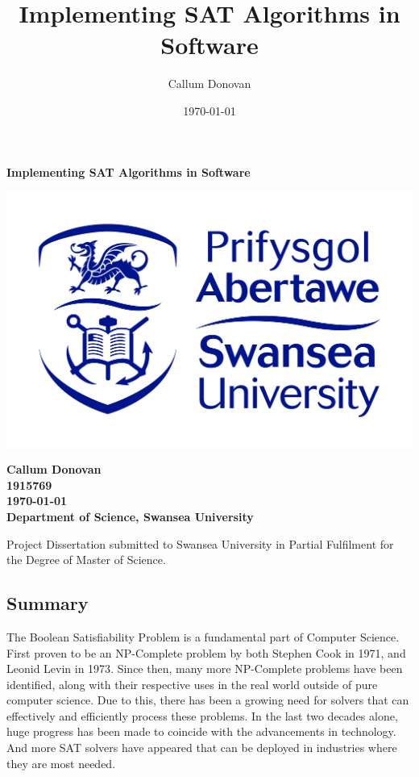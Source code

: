 \documentclass{article}
\title{\bfseries Implementing SAT Algorithms in Software}
\author{Callum Donovan}
\date{ \today }
\begin{document}
\begin{titlepage}
    \begin{center}
        \Large{\bfseries Implementing SAT Algorithms in Software} \\
        \vspace*{\fill}
        \begin{center}
            \includegraphics[scale=0.15]{swan.jpg}
        \end{center}
        \vspace*{\fill}
        \bfseries{\large Callum Donovan \\
            1915769 \\
            \today \\
            Department of Science, Swansea University \\}

        \vspace*{\fill}

        \large{Project Dissertation submitted to Swansea University in Partial Fulfilment for the Degree of Master of Science.}
    \end{center}
\end{titlepage}

\thispagestyle{empty}
\begin{center}
    \section*{Summary}
\end{center}
The Boolean Satisfiability Problem is a fundamental part of Computer Science. First proven to be an
NP-Complete problem by both Stephen Cook in 1971\cite{scook}, and Leonid Levin in 1973\cite{levin}. Since then, many more
NP-Complete problems have been identified, along with their respective uses in the real world
outside of pure computer science. Due to this, there has been a growing need for solvers that can
effectively and efficiently process these problems. In the last two decades alone, huge progress has
been made to coincide with the advancements in technology. And more SAT solvers have appeared that
can be deployed in industries where they are most needed.
\end{document}
